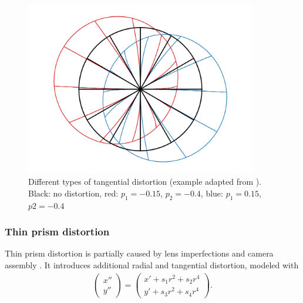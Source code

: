 \begin{figure}[ht]
	\centering
	\includegraphics[width=0.9\textwidth]{2-theory/calibration/distortion/tangential.png}
	\caption{Different types of tangential distortion (example adapted from \cite{weng}). Black: no distortion, red: $p_1 = -0.15$, $p_2=-0.4$, blue: $p_1 = 0.15$, $p2=-0.4$\label{theory:tangential}}
\end{figure} 

\subsubsection{Thin prism distortion}
Thin prism distortion is partially caused by lens imperfections and camera assembly \cite{weng}.
It introduces additional radial and tangential distortion, modeled with
\begin{align}
\begin{pmatrix}
x''\\
y''
\end{pmatrix}=
\begin{pmatrix}
x' + s_1 r^2 + s_2 r^4\\
y' + s_3 r^2 + s_4 r^4
\end{pmatrix}\label{theory:prismdist}.
\end{align}

